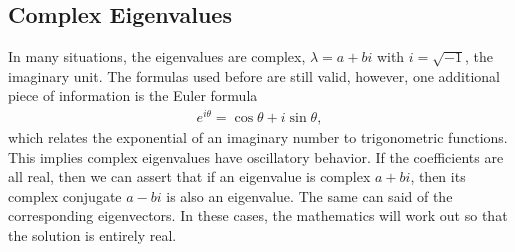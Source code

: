 \subsection{Complex Eigenvalues} \label{Sec:ode_diagonalization_complexEigenvalues}

In many situations, the eigenvalues are complex, $\lambda = a + bi$ with $i = \sqrt{-1}$, the imaginary unit. The formulas used before are still valid, however, one additional piece of information is the Euler formula
\begin{align}
  e^{i\theta} = \cos \theta + i \sin \theta,
\end{align}
which relates the exponential of an imaginary number to trigonometric functions. This implies complex eigenvalues have oscillatory behavior. If the coefficients are all real, then we can assert that if an eigenvalue is complex $a + bi$, then its complex conjugate $a - bi$ is also an eigenvalue. The same can said of the corresponding eigenvectors. In these cases, the mathematics will work out so that the solution is entirely real.

